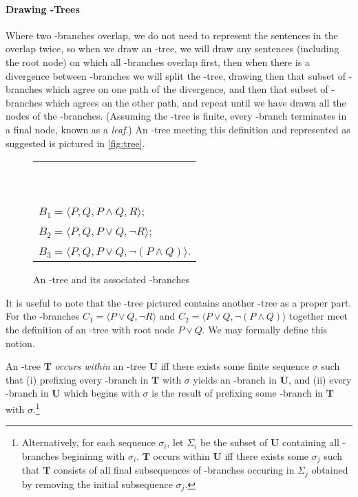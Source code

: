 \paragraph{Drawing \lone-Trees} Where two \lone-branches overlap, we do not need to represent the sentences in the overlap twice, so when we draw an \lone-tree, we will draw any sentences (including the root node) on which all \lone-branches overlap first, then when there is a divergence between \lone-branches we will split the \lone-tree, drawing then that subset of \lone-branches which agree on one path of the divergence, and then that subset of \lone-branches which agrees on the other path, and repeat until we have drawn all the nodes of the \lone-branches. (Assuming the \lone-tree is finite, every \lone-branch terminates in a final node, known as a \emph{leaf}.) An \lone-tree meeting this definition and represented as suggested is pictured in \autoref{fig:tree}. 
\begin{figure}[t]
\centering
\qobitree
\quad \begin{tabular}{l}
~ \\
~ \\
 $B_{1} = \langle P, Q, P\wedge Q, R\rangle$;\\
 $B_{2} = \langle P, Q, P\vee Q, ¬R\rangle$;\\
 $B_{3} = \langle P, Q, P\vee Q, ¬(P\wedge Q)\rangle$.
\end{tabular}


   \caption{An \lone-tree and its associated \lone-branches}
    \label{fig:tree}
\end{figure}


It is useful to note that the \lone-tree pictured contains another \lone-tree as a proper part. For the \lone-branches $C_{1} = \langle P\vee Q, ¬R\rangle$ and $C_{2} = \langle P\vee Q, ¬(P\wedge Q)\rangle$ together meet the definition of an \lone-tree with root node $P \vee Q$. We may formally define this notion. \begin{definition} \label{def:occurswithin}
An \lone-tree $\mathbf{T}$ \emph{occurs within} an \lone-tree $\mathbf{U}$ iff there exists some finite sequence $\sigma$ such that (i) prefixing every \lone-branch in $\mathbf{T}$ with $\sigma$ yields an \lone-branch in $\mathbf{U}$, and (ii) every \lone-branch in $\mathbf{U}$ which begins with $\sigma$ is the result of prefixing some \lone-branch in $\mathbf{T}$ with $\sigma$.\footnote{Alternatively, for each sequence $\sigma_{i}$, let $\Sigma_{i}$ be the subset of $\mathbf{U}$ containing all \lone-branches begininng with $\sigma_{i}$. $\mathbf{T}$ occurs within $\mathbf{U}$ iff there exists some $\sigma_{j}$ such that $\mathbf{T}$ consists of all final subsequences of \lone-branches occuring in $\Sigma_{j}$ obtained by removing the initial subsequence $\sigma_{j}$.}
\end{definition} 

